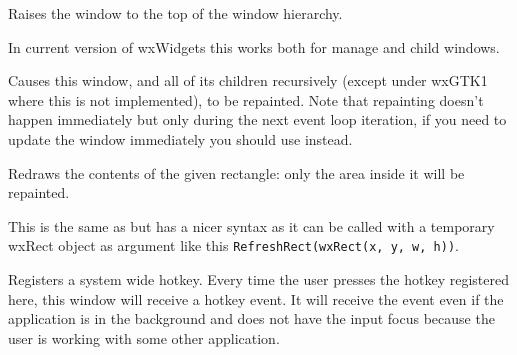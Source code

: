 \label{wxwindowraise}


Raises the window to the top of the window hierarchy.

In current version of wxWidgets this works both for manage and child windows.




\label{wxwindowrefresh}


Causes this window, and all of its children recursively (except under wxGTK1
where this is not implemented), to be repainted. Note that repainting doesn't
happen immediately but only during the next event loop iteration, if you need
to update the window immediately you should use 
instead.







\label{wxwindowrefreshrect}


Redraws the contents of the given rectangle: only the area inside it will be
repainted.

This is the same as  but has a nicer syntax
as it can be called with a temporary wxRect object as argument like this
\texttt{RefreshRect(wxRect(x, y, w, h))}.


\label{wxwindowregisterhotkey}


Registers a system wide hotkey. Every time the user presses the hotkey registered here, this window
will receive a hotkey event. It will receive the event even if the application is in the background
and does not have the input focus because the user is working with some other application.

